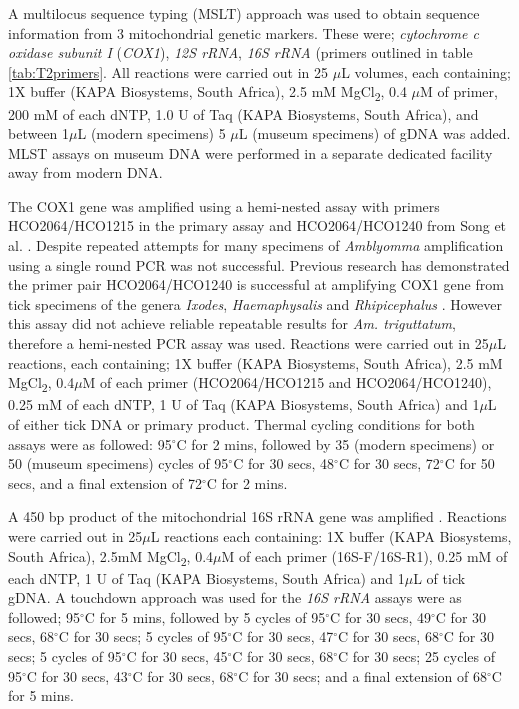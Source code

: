 \documentclass[a4paper, nobind]{templates/ociamthesis}
\begin{document}
A multilocus sequence typing (MSLT) approach was used to obtain sequence information from 3 mitochondrial genetic markers. These were; \emph{cytochrome c oxidase subunit I} (\emph{COX1}), \emph{12S rRNA}, \emph{16S rRNA} (primers outlined in table \ref{tab:T2primers}.
All reactions were carried out in 25 \(\mu\)L volumes, each containing; 1X buffer (KAPA Biosystems, South Africa), 2.5 mM MgCl\textsubscript{2}, 0.4 \(\mu\)M of primer, 200 mM of each dNTP, 1.0 U of Taq (KAPA Biosystems, South Africa), and between 1\(\mu\)L (modern specimens) 5 \(\mu\)L (museum specimens) of gDNA was added. MLST assays on museum DNA were performed in a separate dedicated facility away from modern DNA.

The COX1 gene was amplified using a hemi-nested assay with primers HCO2064/HCO1215 in the primary assay and HCO2064/HCO1240 from Song et al. \autocite*{songPhylogeneticPhylogeographicRelationships2011}.
Despite repeated attempts for many specimens of \emph{Amblyomma} amplification using a single round PCR was not successful. Previous research has demonstrated the primer pair HCO2064/HCO1240 is successful at amplifying COX1 gene from tick specimens of the genera \emph{Ixodes}, \emph{Haemaphysalis} and \emph{Rhipicephalus} \autocite{evansAutomaticBarcodeGap2019}.
However this assay did not achieve reliable repeatable results for \emph{Am. triguttatum}, therefore a hemi-nested PCR assay was used.
Reactions were carried out in 25\(\mu\)L reactions, each containing; 1X buffer (KAPA Biosystems, South Africa), 2.5 mM MgCl\textsubscript{2}, 0.4\(\mu\)M of each primer (HCO2064/HCO1215 and HCO2064/HCO1240), 0.25 mM of each dNTP, 1 U of Taq (KAPA Biosystems, South Africa) and 1\(\mu\)L of either tick DNA or primary product. Thermal cycling conditions for both assays were as followed: 95\(^\circ\)C for 2 mins, followed by 35 (modern specimens) or 50 (museum specimens) cycles of 95\(^\circ\)C for 30 secs, 48\(^\circ\)C for 30 secs, 72\(^\circ\)C for 50 secs, and a final extension of 72\(^\circ\)C for 2 mins.

A 450 bp product of the mitochondrial 16S rRNA gene was amplified \autocite{lvDevelopmentDNABarcoding2014}. Reactions were carried out in 25\(\mu\)L reactions each containing: 1X buffer (KAPA Biosystems, South Africa), 2.5mM MgCl\textsubscript{2}, 0.4\(\mu\)M of each primer (16S-F/16S-R1), 0.25 mM of each dNTP, 1 U of Taq (KAPA Biosystems, South Africa) and 1\(\mu\)L of tick gDNA. A touchdown approach was used for the \emph{16S rRNA} assays were as followed; 95\(^\circ\)C for 5 mins, followed by 5 cycles of 95\(^\circ\)C for 30 secs, 49\(^\circ\)C for 30 secs, 68\(^\circ\)C for 30 secs; 5 cycles of 95\(^\circ\)C for 30 secs, 47\(^\circ\)C for 30 secs, 68\(^\circ\)C for 30 secs; 5 cycles of 95\(^\circ\)C for 30 secs, 45\(^\circ\)C for 30 secs, 68\(^\circ\)C for 30 secs; 25 cycles of 95\(^\circ\)C for 30 secs, 43\(^\circ\)C for 30 secs, 68\(^\circ\)C for 30 secs; and a final extension of 68\(^\circ\)C for 5 mins.
\end{document}
